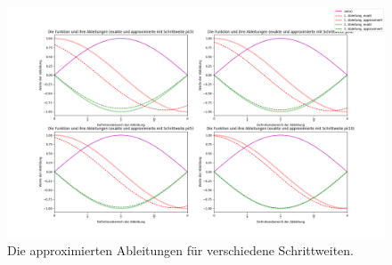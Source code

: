 \documentclass[smallheadings]{scrartcl}
\begin{document}
\begin{figure}
	\includegraphics[width=\linewidth]{4Bilder.png}
	\caption{Die approximierten Ableitungen für verschiedene Schrittweiten.}
	\label{Abbildung 1}
\end{figure}

\end{document}
